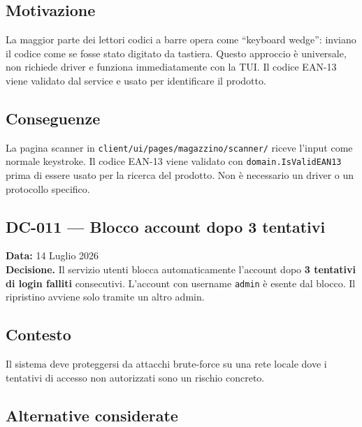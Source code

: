 \documentclass[a4paper,12pt]{article}
\begin{document}
\subsection*{Motivazione}
La maggior parte dei lettori codici a barre opera come ``keyboard wedge'': inviano il codice come se fosse stato digitato da tastiera. Questo approccio \`{e} universale, non richiede driver e funziona immediatamente con la TUI. Il codice EAN-13 viene validato dal service e usato per identificare il prodotto.

\subsection*{Conseguenze}
La pagina scanner in \texttt{client/ui/pages/magazzino/scanner/} riceve l'input come normale keystroke. Il codice EAN-13 viene validato con \texttt{domain.IsValidEAN13} prima di essere usato per la ricerca del prodotto. Non \`{e} necessario un driver o un protocollo specifico.

\begin{decisionbox}
\section*{DC-011 --- Blocco account dopo 3 tentativi}
\textbf{Data:} 14 Luglio 2026\\
\textbf{Decisione.} Il servizio utenti blocca automaticamente l'account dopo \textbf{3 tentativi di login falliti} consecutivi. L'account con username \texttt{admin} \`{e} esente dal blocco. Il ripristino avviene solo tramite un altro admin.
\end{decisionbox}

\subsection*{Contesto}
Il sistema deve proteggersi da attacchi brute-force su una rete locale dove i tentativi di accesso non autorizzati sono un rischio concreto.


\subsection*{Alternative considerate}
\end{document}
